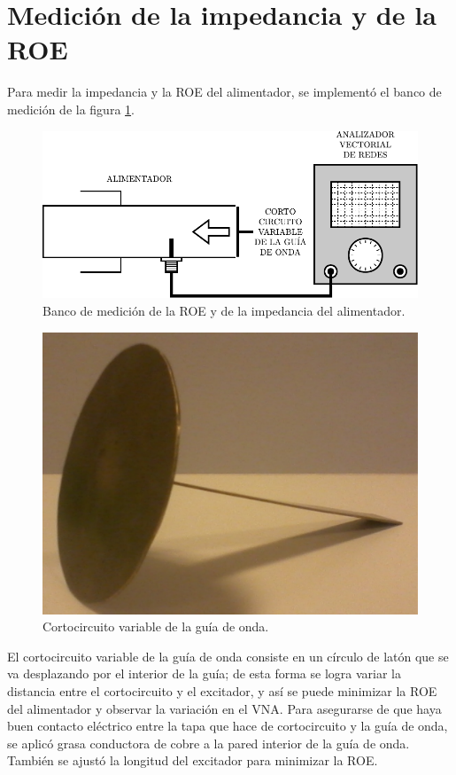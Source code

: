 \section{Medición de la impedancia y de la ROE}
\label{sec_resultados_med_imp_roe}

Para medir la impedancia y la ROE del alimentador, se implementó el banco de medición de la figura \ref{fig_resultados:10}.
\begin{figure} [H]
\centering 
\includegraphics[scale = 1]{Figures/Resultados/resultados_10}
\caption{Banco de medición de la ROE y de la impedancia del alimentador.}
\label{fig_resultados:10}
\end{figure}
\begin{figure} [H]
\centering 
\includegraphics[scale = 0.3]{Figures/Resultados/resultados_11}
\caption{Cortocircuito variable de la guía de onda.}
\label{fig_resultados:11}
\end{figure}
El cortocircuito variable de la guía de onda consiste en un círculo de latón que se va desplazando por el interior de la guía; de esta forma se logra variar la distancia entre el cortocircuito y el excitador, y así se puede minimizar la ROE del alimentador y observar la variación en el VNA. Para asegurarse de que haya buen contacto eléctrico entre la tapa que hace de cortocircuito y la guía de onda, se aplicó grasa conductora de cobre a la pared interior de la guía de onda. También se ajustó la longitud del excitador para minimizar la ROE.

